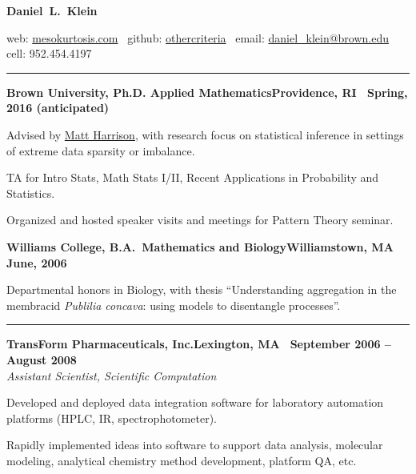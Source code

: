 \documentclass{article}
\newcommand{\ressection}[1]{\noindent{\large\textbf{#1}}\vspace{2pt}\hrule\vspace{4pt}}
\newcommand{\leftandright}[2]{\noindent\textbf{#1}\hfill\textbf{#2}}
\begin{document}
\sffamily

\begin{center}
\textbf{\huge{Daniel~L.~Klein}}

web: \href{http://mesokurtosis.com}{mesokurtosis.com}
\textbullet\, github: \href{https://github.com/othercriteria}{othercriteria}
\textbullet\, email: \href{mailto:daniel_klein@brown.edu}{daniel\_klein@brown.edu}
\textbullet\, cell: 952.454.4197
\end{center}

\ressection{Education}

\leftandright{Brown University, \textmd{Ph.D. Applied
    Mathematics}}{Providence, RI \textbullet\ Spring, 2016 (anticipated)}
\begin{itemize*}
\item Advised by \href{http://www.dam.brown.edu/people/harrison}{Matt
    Harrison}, with research focus on statistical inference in
  settings of extreme data sparsity or imbalance.
\item TA for Intro Stats, Math Stats I/II, Recent Applications in
  Probability and Statistics.
\item Organized and hosted speaker visits and meetings for Pattern
  Theory seminar.
\end{itemize*}

\leftandright{Williams College, \textmd{B.A.\ Mathematics and
    Biology}}{Williamstown, MA \textbullet\, June, 2006}
\begin{itemize*}
\item Departmental honors in Biology, with thesis ``Understanding
  aggregation in the membracid \emph{Publilia concava}: using models
  to disentangle processes''.
\end{itemize*}

\vspace{1.0em}

\ressection{Work experience}

\leftandright{TransForm Pharmaceuticals, Inc.}{Lexington, MA
  \textbullet\, September 2006 -- August 2008} \\
\textit{Assistant Scientist, Scientific Computation}

\begin{itemize*}
\item Developed and deployed data integration software for laboratory
  automation platforms (HPLC, IR, spectrophotometer).
\item Rapidly implemented ideas into software to support data
  analysis, molecular modeling, analytical chemistry method
  development, platform QA, etc.
\end{itemize*}
\end{document}
